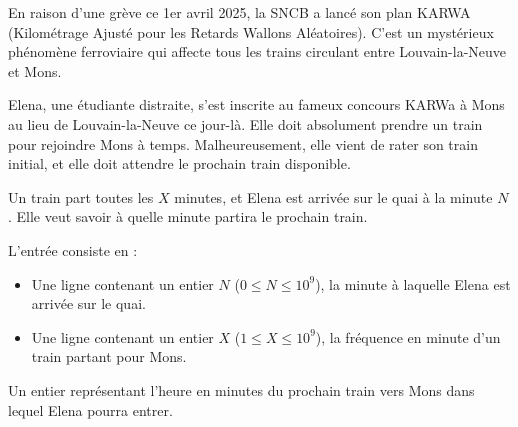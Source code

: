 \problemname{\problemyamlname{}}


En raison d'une grève ce 1er avril 2025, la SNCB a lancé son plan KARWA (Kilométrage Ajusté pour les Retards Wallons Aléatoires). C'est un mystérieux phénomène ferroviaire qui affecte tous les trains circulant entre Louvain-la-Neuve et Mons.

Elena, une étudiante distraite, s'est inscrite au fameux concours KARWa à Mons au lieu de Louvain-la-Neuve ce jour-là. Elle doit absolument prendre un train pour rejoindre Mons à temps. Malheureusement, elle vient de rater son train initial, et elle doit attendre le prochain train disponible.

Un train part toutes les $X$ minutes, et Elena est arrivée sur le quai à la minute $N$. Elle veut savoir à quelle minute partira le prochain train.

\begin{Input}
    L'entrée consiste en :
    \begin{itemize}
        \item Une ligne contenant un entier $N$ ($0 \leq N \leq 10^{9}$), la minute à laquelle Elena est arrivée sur le quai.
        \item Une ligne contenant un entier $X$ ($1 \leq X \leq 10^{9}$), la fréquence en minute d'un train partant pour Mons.
    \end{itemize}
\end{Input}

\begin{Output}
    Un entier représentant l'heure en minutes du prochain train vers Mons dans lequel Elena pourra entrer.
\end{Output}
